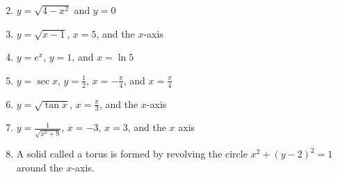 \documentclass[12pt]{article}
\newif\ifans
\begin{document}

\begin{enumerate}
\setcounter{enumi}{1}

\item $y=\sqrt{4-x^2}$ and $y=0$

\ifans{\fbox{$\frac{32\pi}{3}$}} \fi

\item $y=\sqrt{x-1}$, $x=5$, and the $x$-axis

\ifans{\fbox{$8\pi$}} \fi

\item $y=e^x$, $y=1$, and $x=\ln{5}$

\ifans{\fbox{$\pi(12-\ln{5})$}} \fi

\item $y=\sec{x}$, $y=\frac{1}{2}$, $x=-\frac{\pi}{4}$, and $x=\frac{\pi}{4}$

\ifans{\fbox{$2\pi-\frac{\pi^2}{8}$; Detailed Solution: \textcolor{blue}{\href{http://www.math.drexel.edu/classes/Calculus/resources/Math122HW/Solutions/122_08_Volume_05.pdf}{Here}}}} \fi

\item $y=\sqrt{\tan{x}}$, $x=\frac{\pi}{3}$, and the $x$-axis

\ifans{\fbox{$\pi\ln{2}$}} \fi

\item $y=\frac{1}{\sqrt{x^2+9}}$, $x=-3$, $x=3$, and the $x$ axis

\ifans{\fbox{$\frac{\pi^2}{6}$}} \fi

\item A solid called a torus is formed by revolving the circle $x^2+(y-2)^2=1$ around the $x$-axis. 


\end{enumerate}
\end{document}
